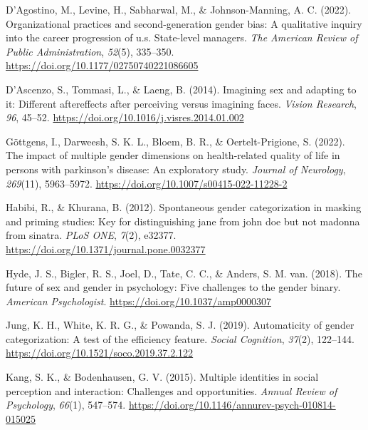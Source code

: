 \documentclass[
  man]{apa7}
\newlength{\cslhangindent}
\newlength{\cslentryspacingunit} %
\newenvironment{CSLReferences}[2] %
 {%
  \setlength{\parindent}{0pt}
  \ifodd #1
  \let\oldpar\par
  \def\par{\hangindent=\cslhangindent\oldpar}
  \fi
  \setlength{\parskip}{#2\cslentryspacingunit}
 }%
 {}
\begin{document}
\begin{CSLReferences}{1}{0}
\leavevmode{}%
D'Agostino, M., Levine, H., Sabharwal, M., \& Johnson-Manning, A. C. (2022). Organizational practices and second-generation gender bias: A qualitative inquiry into the career progression of u.s. State-level managers. \emph{The American Review of Public Administration}, \emph{52}(5), 335--350. \url{https://doi.org/10.1177/02750740221086605}

\leavevmode{}%
D'Ascenzo, S., Tommasi, L., \& Laeng, B. (2014). Imagining sex and adapting to it: Different aftereffects after perceiving versus imagining faces. \emph{Vision Research}, \emph{96}, 45--52. \url{https://doi.org/10.1016/j.visres.2014.01.002}

\leavevmode{}%
Göttgens, I., Darweesh, S. K. L., Bloem, B. R., \& Oertelt-Prigione, S. (2022). The impact of multiple gender dimensions on health-related quality of life in persons with parkinson's disease: An exploratory study. \emph{Journal of Neurology}, \emph{269}(11), 5963--5972. \url{https://doi.org/10.1007/s00415-022-11228-2}

\leavevmode{}%
Habibi, R., \& Khurana, B. (2012). Spontaneous gender categorization in masking and priming studies: Key for distinguishing jane from john doe but not madonna from sinatra. \emph{{PLoS} {ONE}}, \emph{7}(2), e32377. \url{https://doi.org/10.1371/journal.pone.0032377}

\leavevmode{}%
Hyde, J. S., Bigler, R. S., Joel, D., Tate, C. C., \& Anders, S. M. van. (2018). The future of sex and gender in psychology: Five challenges to the gender binary. \emph{American Psychologist}. \url{https://doi.org/10.1037/amp0000307}

\leavevmode{}%
Jung, K. H., White, K. R. G., \& Powanda, S. J. (2019). Automaticity of gender categorization: A test of the efficiency feature. \emph{Social Cognition}, \emph{37}(2), 122--144. \url{https://doi.org/10.1521/soco.2019.37.2.122}

\leavevmode{}%
Kang, S. K., \& Bodenhausen, G. V. (2015). Multiple identities in social perception and interaction: Challenges and opportunities. \emph{Annual Review of Psychology}, \emph{66}(1), 547--574. \url{https://doi.org/10.1146/annurev-psych-010814-015025}


\end{CSLReferences}
\end{document}
